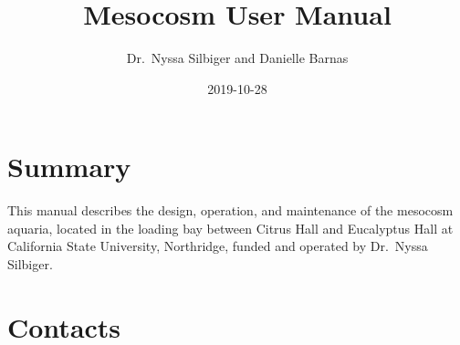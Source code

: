 \documentclass[]{book}
\title{Mesocosm User Manual}
\author{Dr.~Nyssa Silbiger and Danielle Barnas}
\date{2019-10-28}
\begin{document}
\maketitle

{
\setcounter{tocdepth}{1}
\tableofcontents
}
\chapter{Summary}\label{summary}

This manual describes the design, operation, and maintenance of the
mesocosm aquaria, located in the loading bay between Citrus Hall and
Eucalyptus Hall at California State University, Northridge, funded and
operated by Dr.~Nyssa Silbiger.

\chapter{Contacts}\label{contacts}
\end{document}
